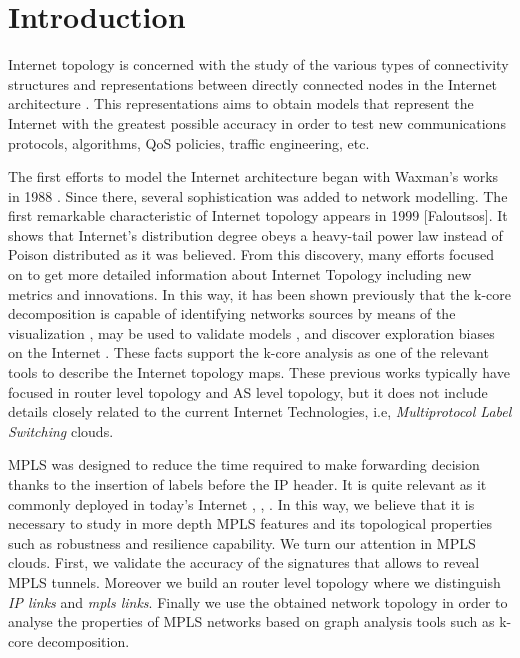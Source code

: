 \section{Introduction}

Internet topology is concerned with the study of the various types of connectivity structures and representations between directly connected nodes in the Internet architecture \cite{Calvert97}. This representations aims to obtain models that represent the Internet with the greatest possible accuracy in order to test new communications protocols, algorithms, QoS policies, traffic engineering, etc. 
 
The first efforts to model the Internet architecture began with Waxman's works in 1988 \cite{Waxman88}. Since there, several sophistication was added to network modelling. The first remarkable characteristic of Internet topology appears  in 1999 [Faloutsos]. It shows that Internet's distribution degree obeys a heavy-tail power law instead of Poison distributed as it was believed. From this discovery, many efforts focused on to get more detailed information about Internet Topology including new metrics and innovations. In this way, it has been shown previously that the k-core decomposition is capable of identifying networks sources by means of the visualization \cite{Alvarez06k} \cite{Beiro09}, may be used to validate models \cite{Serrano06}, and discover exploration biases on the Internet \cite{Alvarez08k}. These facts support the k-core analysis as one of the relevant tools to describe the Internet topology maps. These previous works typically have focused in router level topology and AS level topology, but it does not include details closely related to the current Internet Technologies, i.e, \textit{Multiprotocol Label Switching} clouds. 

MPLS was designed to reduce the time required to make forwarding decision thanks to the insertion of labels before the IP header. It is quite relevant as it commonly deployed in today's Internet \cite{SOM11}, \cite{Donnet12}, \cite{Vanaubel15}.  In this way, we believe that it is necessary to study in more depth MPLS features and its topological properties such as robustness and resilience capability. We turn our attention  in MPLS clouds. First, we validate the accuracy of the signatures that allows to reveal MPLS tunnels. Moreover we build an router level topology where we distinguish \textit{IP links} and \textit{mpls links}. Finally we use the obtained network topology in order to analyse the properties of MPLS networks based on graph analysis tools such as k-core decomposition.


